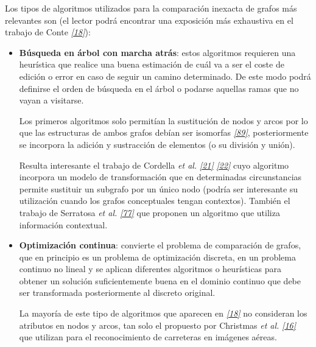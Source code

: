 \documentclass[a4paper,12pt,spanish]{book}
\begin{document}
Los tipos de algoritmos utilizados para la comparación inexacta de grafos más relevantes
son (el lector podrá encontrar una exposición más exhaustiva en el trabajo de Conte \label{1.state-of-the-art/ii.medidas-distancia:id19}{\hyperref[zreferences:conte2004]{\emph{{[}18{]}}}}):
\begin{itemize}
\item {} 
\textbf{Búsqueda en árbol con marcha atrás}: estos algoritmos requieren una heurística que
realice una buena estimación de cuál va a ser el coste de edición o error en caso de
seguir un camino determinado. De este modo podrá definirse el orden de búsqueda en el
árbol o podarse aquellas ramas que no vayan a visitarse.

Los primeros algoritmos solo permitían la sustitución de nodos y arcos por lo que las
estructuras de ambos grafos debían ser isomorfas \label{1.state-of-the-art/ii.medidas-distancia:id20}{\hyperref[zreferences:tsai1979]{\emph{{[}89{]}}}}, posteriormente se
incorpora la adición y sustracción de elementos (o su división y unión).

Resulta interesante el trabajo de Cordella \emph{et al.} \label{1.state-of-the-art/ii.medidas-distancia:id21}{\hyperref[zreferences:cordella1996]{\emph{{[}21{]}}}}
\label{1.state-of-the-art/ii.medidas-distancia:id22}{\hyperref[zreferences:cordella1998a]{\emph{{[}22{]}}}} cuyo algoritmo incorpora un modelo de transformación que en
determinadas circunstancias permite sustituir un subgrafo por un único nodo (podría
ser interesante su utilización cuando los grafos conceptuales tengan contextos).
También el trabajo de Serratosa \emph{et al.} \label{1.state-of-the-art/ii.medidas-distancia:id23}{\hyperref[zreferences:serratosa2000]{\emph{{[}77{]}}}} que proponen un
algoritmo que utiliza información contextual.

\item {} 
\textbf{Optimización continua}: convierte el problema de comparación de grafos, que en principio es
un problema de optimización discreta, en un problema continuo no lineal y se aplican
diferentes algoritmos o heurísticas para obtener un solución suficientemente buena en
el dominio continuo que debe ser transformada posteriormente al discreto original.

La mayoría de este tipo de algoritmos que aparecen en \label{1.state-of-the-art/ii.medidas-distancia:id24}{\hyperref[zreferences:conte2004]{\emph{{[}18{]}}}} no consideran
los atributos en nodos y arcos, tan solo el propuesto por Christmas \emph{et al.}
\label{1.state-of-the-art/ii.medidas-distancia:id25}{\hyperref[zreferences:christmas1995]{\emph{{[}16{]}}}} que utilizan para el reconocimiento de carreteras en imágenes
aéreas.


\end{itemize}
\end{document}

